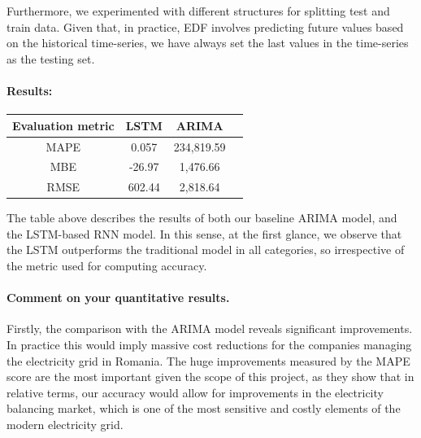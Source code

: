 \documentclass[10pt,twocolumn,letterpaper]{article}
\begin{document}
Furthermore, we experimented with different structures for splitting test and train data. Given that, in practice, EDF involves predicting future values based on the historical time-series, we have always set the last values in the time-series as the testing set.

\paragraph{Results:}

\begin{center}
 \begin{tabular}{||c c c c||} 
 \hline
Evaluation metric & LSTM & ARIMA &\\ [0.5ex] 
 \hline\hline
 MAPE & 0.057 & 234,819.59 &\\ 
 \hline
 MBE & -26.97 & 1,476.66 &\\
 \hline
 RMSE & 602.44 & 2,818.64 & \\
 \hline
\end{tabular}
\end{center}

The table above describes the results of both our baseline ARIMA model, and the LSTM-based RNN model. In this sense, at the first glance, we observe that the LSTM outperforms the traditional model in all categories, so irrespective of the metric used for computing accuracy.


\paragraph{Comment on your quantitative results.} 

Firstly, the comparison with the ARIMA model reveals significant improvements. In practice this would imply massive cost reductions for the companies managing the electricity grid in Romania. The huge improvements measured by the MAPE score are the most important given the scope of this project, as they show that in relative terms, our accuracy would allow for improvements in the electricity balancing market, which is one of the most sensitive and costly elements of the modern electricity grid.
\end{document}
